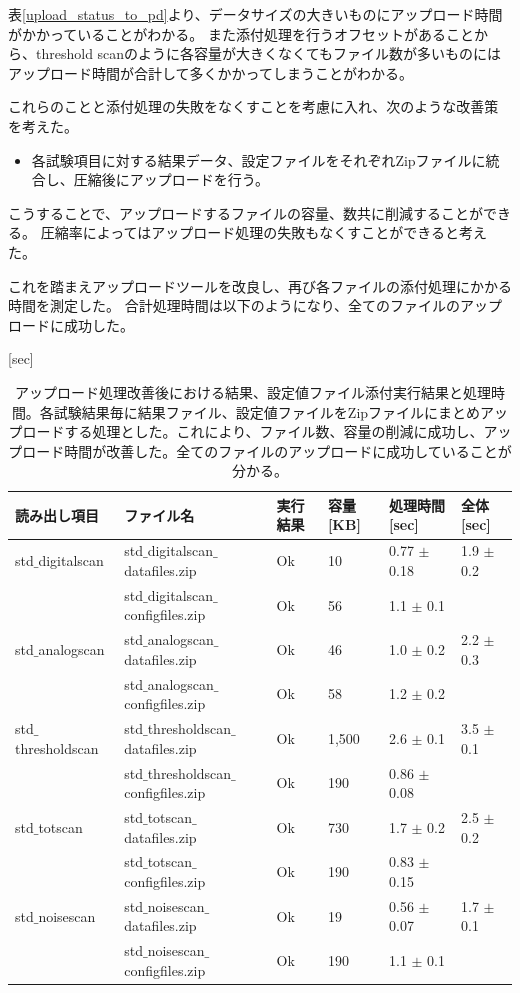\newpage
表\ref{upload_status_to_pd}より、データサイズの大きいものにアップロード時間がかかっていることがわかる。
また添付処理を行うオフセットがあることから、threshold scanのように各容量が大きくなくてもファイル数が多いものにはアップロード時間が合計して多くかかってしまうことがわかる。

これらのことと添付処理の失敗をなくすことを考慮に入れ、次のような改善策を考えた。

\begin{itemize}
  \item 各試験項目に対する結果データ、設定ファイルをそれぞれZipファイルに統合し、圧縮後にアップロードを行う。
\end{itemize}

こうすることで、アップロードするファイルの容量、数共に削減することができる。
圧縮率によってはアップロード処理の失敗もなくすことができると考えた。

これを踏まえアップロードツールを改良し、再び各ファイルの添付処理にかかる時間を測定した。
合計処理時間は以下のようになり、全てのファイルのアップロードに成功した。

  [{\rm sec}]
\eee

{\scriptsize
\begin{longtable}{|llllll|}
  \caption[アップロード処理改善後における結果、設定値ファイル添付実行結果と処理時間]{アップロード処理改善後における結果、設定値ファイル添付実行結果と処理時間。各試験結果毎に結果ファイル、設定値ファイルをZipファイルにまとめアップロードする処理とした。これにより、ファイル数、容量の削減に成功し、アップロード時間が改善した。全てのファイルのアップロードに成功していることが分かる。}
  \label{upload_status_to_pd_zip}
  \endhead
  \hline
  読み出し項目 & ファイル名 & 実行結果 & 容量[KB] & 処理時間[sec] & 全体[sec] \\ 
  \hline
 std$\_$digitalscan & std$\_$digitalscan$\_$datafiles.zip & Ok & 10 & 0.77 $\pm$ 0.18 & 1.9 $\pm$ 0.2\\
 & std$\_$digitalscan$\_$configfiles.zip & Ok & 56 & 1.1 $\pm$ 0.1 &\\
\hline
 std$\_$analogscan & std$\_$analogscan$\_$datafiles.zip & Ok & 46 & 1.0 $\pm$ 0.2 & 2.2 $\pm$ 0.3 \\
 & std$\_$analogscan$\_$configfiles.zip & Ok & 58 & 1.2 $\pm$ 0.2 &\\
\hline
 std$\_$thresholdscan & std$\_$thresholdscan$\_$datafiles.zip & Ok & 1,500 & 2.6 $\pm$ 0.1 & 3.5 $\pm$ 0.1 \\
 & std$\_$thresholdscan$\_$configfiles.zip & Ok & 190 & 0.86 $\pm$ 0.08 &\\
\hline
 std$\_$totscan & std$\_$totscan$\_$datafiles.zip & Ok & 730 & 1.7 $\pm$ 0.2 & 2.5 $\pm$ 0.2\\
 & std$\_$totscan$\_$configfiles.zip & Ok & 190 & 0.83 $\pm$ 0.15 &\\
\hline
 std$\_$noisescan & std$\_$noisescan$\_$datafiles.zip & Ok & 19 & 0.56 $\pm$ 0.07 & 1.7 $\pm$ 0.1 \\
 & std$\_$noisescan$\_$configfiles.zip & Ok & 190 & 1.1 $\pm$ 0.1 &\\
\hline
\end{longtable}
}

